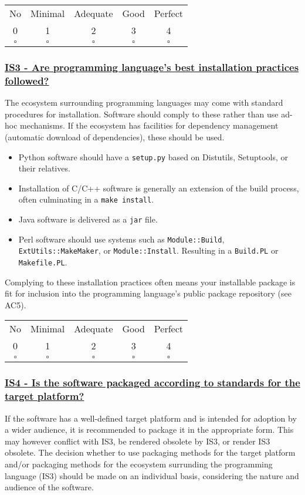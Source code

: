 \documentclass[a4paper,11pt]{article}
\newcommand{\criterion}[2]{\subsubsection*{\underline{#1 - #2}}\label{id:#1}}
\newcommand\CheckTable{%
  \begin{tabular}{ccccc}
    No & Minimal & Adequate & Good & Perfect \\
    0 & 1 & 2 & 3 & 4 \\
    \hline
    $\square$ & $\square$ & $\square$ & $\square$ & $\square$ \\
  \end{tabular}%
}
\begin{document}
\CheckTable

\newcommand{\isThreeID}{IS3}
\newcommand{\isThreeText}{Are programming language's best installation practices followed?}
\criterion{\isThreeID}{\isThreeText}

The ecosystem surrounding programming languages may come with standard
procedures for installation. Software should comply to these rather than use
ad-hoc mechanisms. If the ecosystem has facilities for dependency management
(automatic download of dependencies), these should be used.

\begin{itemize}
 \item Python software should have a \texttt{setup.py} based on Distutils,
     Setuptools, or their relatives.
 \item Installation of C/C++ software is generally an extension of the build
     process, often culminating in a \texttt{make install}.
 \item Java software is delivered as a \texttt{jar} file.
 \item Perl software should use systems such as \texttt{Module::Build},
     \texttt{ExtUtils::MakeMaker}, or \texttt{Module::Install}. Resulting in a
     \texttt{Build.PL} or \texttt{Makefile.PL}.
\end{itemize}

Complying to these installation practices often means your installable package
is fit for inclusion into the programming language's public package repository
(see AC5).

\CheckTable

\newcommand{\isFourID}{IS4}
\newcommand{\isFourText}{Is the software packaged according to standards for the target platform?}
\criterion{\isFourID}{\isFourText}

If the software has a well-defined target platform and is intended for adoption
by a wider audience, it is recommended to package it in the appropriate form.
This may however conflict with IS3, be rendered obsolete by IS3, or render IS3
obsolete. The decision whether to use packaging methods for the target platform
and/or packaging methods for the ecosystem surrunding the programming language
(IS3) should be
%
%
%
made on an individual basis, considering the nature and audience of the
software.
\end{document}
